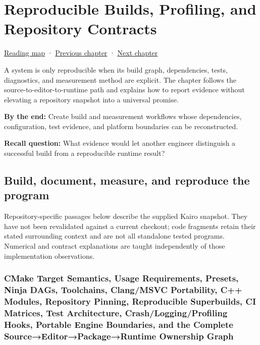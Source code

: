 \chapter{Reproducible Builds, Profiling, and Repository Contracts}\label{01-foundations-i-ch010-reproducible-builds-profiling-and-repository-contracts}\hypertarget{01-foundations-i-ch010}{}\label{stagechapter:01-foundations-i-ch010}

\hypertarget{01-foundations-i-ch010-reproducible-builds-profiling-and-repository-contracts}{}

\hyperref[volume-reading-map]{Reading map} · \hyperref[01-foundations-i-ch007]{Previous chapter} · \hyperref[01-foundations-i-ch011-c-const-borrowing-and-cpugpu-buffering]{Next chapter}

A system is only reproducible when its build graph, dependencies, tests, diagnostics, and measurement method are explicit. The chapter follows the source-to-editor-to-runtime path and explains how to report evidence without elevating a repository snapshot into a universal promise.

\textbf{By the end:} Create build and measurement workflows whose dependencies, configuration, test evidence, and platform boundaries can be reconstructed.

\textbf{Recall question:} What evidence would let another engineer distinguish a successful build from a reproducible runtime result?

\section{Build, document, measure, and reproduce the program}\label{01-foundations-i-ch010-build-document-measure-and-reproduce-the-program}

\hypertarget{01-foundations-i-ch010-build-document-measure-and-reproduce-the-program}{}

Repository-specific passages below describe the supplied Kairo snapshot. They have not been revalidated against a current checkout; code fragments retain their stated surrounding context and are not all standalone tested programs. Numerical and contract explanations are taught independently of those implementation observations.

\subsection{CMake Target Semantics, Usage Requirements, Presets, Ninja DAGs, Toolchains, Clang/MSVC Portability, C++ Modules, Repository Pinning, Reproducible Superbuilds, CI Matrices, Test Architecture, Crash/Logging/Profiling Hooks, Portable Engine Boundaries, and the Complete Source→Editor→Package→Runtime Ownership Graph}\label{01-foundations-i-ch010-cmake-target-semantics-usage-requirements-presets-ninja-dags-toolchains-clangmsvc-portability-c-modules-repository-pinning-reproducible-superbuilds-ci-matrices-test-architecture-crashloggingprofiling-hooks-portable-engine-boundaries-and-the-complete-sourceeditorpackageruntime-ownership-graph}

